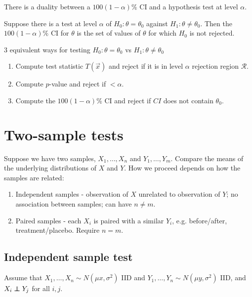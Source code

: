 \documentclass[10pt, a4paper]{article}
\begin{document}
There is a duality between a $100(1 - \alpha)\%$ CI and a hypothesis test at level $\alpha$.

\begin{proposition}
    Suppose there is a test at level $\alpha$ of $H_0 : \theta = \theta_0$ against $H_1 : \theta \neq \theta_0$.
    Then the $100(1 - \alpha)\%$ CI for $\theta$ is the set of values of $\theta$ for which $H_0$ is not rejected.
\end{proposition}

$3$ equivalent ways for testing $H_0 : \theta = \theta_0$ vs $H_1 : \theta \neq \theta_0$
\begin{enumerate}[label = (\arabic*)]
    \item Compute test statistic $T(\vec{x})$ and reject if it is in level $\alpha$ rejection region $\mathcal{R}$.

    \item Compute $p$-value and reject if $< \alpha$.

    \item Compute the $100(1 - \alpha)\%$ CI and reject if $CI$ does not contain $\theta_0$.
\end{enumerate}

\newpage

\section{Two-sample tests}
Suppose we have two samples,
$X_1, \dotsc, X_n$ and $Y_1, \dotsc, Y_m$.
Compare the means of the underlying distributions of $X$ and $Y$.
How we proceed depends on how the samples are related:
\begin{enumerate}[label = (\arabic*)]
    \item Independent samples -
    observation of $X$ unrelated to observation of $Y$;
    no association between samples;
    can have $n \neq m$.

    \item Paired samples -
    each $X_i$ is paired with a similar $Y_i$,
    e.g.
    before/after,
    treatment/placebo.
    Require $n = m$.
\end{enumerate}

\subsection{Independent sample test}
Assume that $X_1, \dotsc, X_n \sim N(\mu x, \sigma ^ 2)$ IID and $Y_1, \dotsc, Y_n \sim N(\mu y, \sigma ^ 2)$ IID,
and $X_i \independent Y_j$ for all $i, j$.
\end{document}
